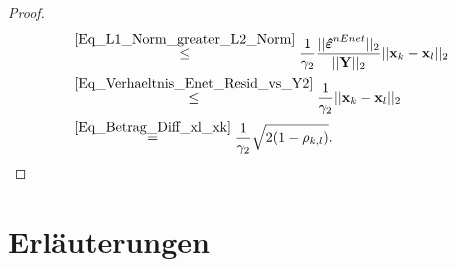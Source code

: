 \documentclass[12pt, a4paper]{report}\usepackage[]{graphicx}\usepackage[]{color}
\begin{document}
\begin{appendix}
\begin{proof}
\begin{align*}
&\stackrel{\eqref{Eq_L1_Norm_greater_L2_Norm}}{\leq} \frac{1}{\gamma_2} {\frac{||\boldsymbol{\hat{\varepsilon}}^{nEnet}||_2}{||\mathbf{Y}||_2}}
||\mathbf{x}_k - \mathbf{x}_l||_2 \\
&\stackrel{\eqref{Eq_Verhaeltnis_Enet_Resid_vs_Y2}}{\leq} \frac{1}{\gamma_2}
||\mathbf{x}_k - \mathbf{x}_l||_2 \\
&\stackrel{\eqref{Eq_Betrag_Diff_xl_xk}}{=} \frac{1}{\gamma_2}\sqrt{2(1-\rho_{k,l})}.
\end{align*}
\end{proof}





\chapter{Erläuterungen}

\end{appendix}
\end{document}
